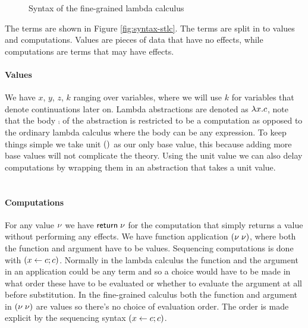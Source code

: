 {%

\begin{figure}
\caption{Syntax of the fine-grained lambda calculus}
\centering
{}
\end{figure}

The terms are shown in Figure \ref{fig:syntax-stlc}.
The terms are split in to values and computations.
Values are pieces of data that have no effects, while computations are terms that may have effects.

\paragraph{Values} We have $x$, $y$, $z$, $k$ ranging over variables, where we will use $k$ for variables that denote continuations later on.
Lambda abstractions are denoted as $\lambda x . c$, note that the body $\comp$ of the abstraction is restricted to be a computation as opposed to the ordinary lambda calculus where the body can be any expression.
To keep things simple we take unit $()$ as our only base value, this because adding more base values will not complicate the theory.
Using the unit value we can also delay computations by wrapping them in an abstraction that takes a unit value.
\\\\
\paragraph{Computations} For any value $\nu$ we have $\mathsf{return} \; \nu$ for the computation that simply returns a value without performing any effects. We have function application $(\nu \; \nu)$, where both the function and argument have to be values. Sequencing computations is done with $(x \leftarrow c ; c)$. Normally in the lambda calculus the function and the argument in an application could be any term and so a choice would have to be made in what order these have to be evaluated or whether to evaluate the argument at all before substitution. In the fine-grained calculus both the function and argument in $(\nu \; \nu)$ are values so there's no choice of evaluation order. The order is made explicit by the sequencing syntax $(x \leftarrow c ; c)$.

}
